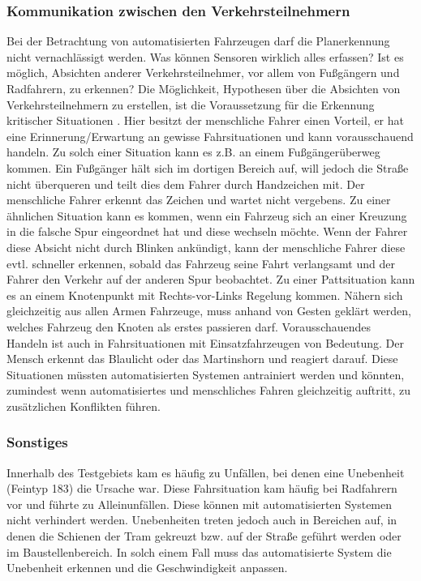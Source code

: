 \subsubsection{Kommunikation zwischen den Verkehrsteilnehmern}
Bei der Betrachtung von automatisierten Fahrzeugen darf die Planerkennung nicht vernachlässigt werden. Was können Sensoren wirklich alles erfassen? Ist es möglich, Absichten anderer Verkehrsteilnehmer, vor allem von Fußgängern und Radfahrern, zu erkennen? Die Möglichkeit, Hypothesen über die Absichten von Verkehrsteilnehmern zu erstellen, ist die Voraussetzung für die Erkennung kritischer Situationen \parencite[S. 30]{MockHecker.1994}. Hier besitzt der menschliche Fahrer einen Vorteil, er hat eine Erinnerung/Erwartung an gewisse Fahrsituationen und kann vorausschauend handeln. Zu solch einer Situation kann es z.B. an einem Fußgängerüberweg kommen. Ein Fußgänger hält sich im dortigen Bereich auf, will jedoch die Straße nicht überqueren und teilt dies dem Fahrer durch Handzeichen mit. Der menschliche Fahrer erkennt das Zeichen und wartet nicht vergebens. Zu einer ähnlichen Situation kann es kommen, wenn ein Fahrzeug sich an einer Kreuzung in die falsche Spur eingeordnet hat und diese wechseln möchte. Wenn der Fahrer diese Absicht nicht durch Blinken ankündigt, kann der menschliche Fahrer diese evtl. schneller erkennen, sobald das Fahrzeug seine Fahrt verlangsamt und der Fahrer den Verkehr auf der anderen Spur beobachtet. Zu einer Pattsituation kann es an einem Knotenpunkt mit Rechts-vor-Links Regelung kommen. Nähern sich gleichzeitig aus allen Armen Fahrzeuge, muss anhand von Gesten geklärt werden, welches Fahrzeug den Knoten als erstes passieren darf. Vorausschauendes Handeln ist auch in Fahrsituationen mit Einsatzfahrzeugen von Bedeutung. Der Mensch erkennt das Blaulicht oder das Martinshorn und reagiert darauf. Diese Situationen müssten automatisierten Systemen antrainiert werden und könnten, zumindest wenn automatisiertes und menschliches Fahren gleichzeitig auftritt, zu zusätzlichen Konflikten führen.

\subsubsection{Sonstiges}
Innerhalb des Testgebiets kam es häufig zu Unfällen, bei denen eine Unebenheit (Feintyp 183) die Ursache war. Diese Fahrsituation kam häufig bei Radfahrern vor und führte zu Alleinunfällen. Diese können mit automatisierten Systemen nicht verhindert werden. Unebenheiten treten jedoch auch in Bereichen auf, in denen die Schienen der Tram gekreuzt bzw. auf der Straße geführt werden oder im Baustellenbereich. In solch einem Fall muss das automatisierte System die Unebenheit erkennen und die Geschwindigkeit anpassen.


